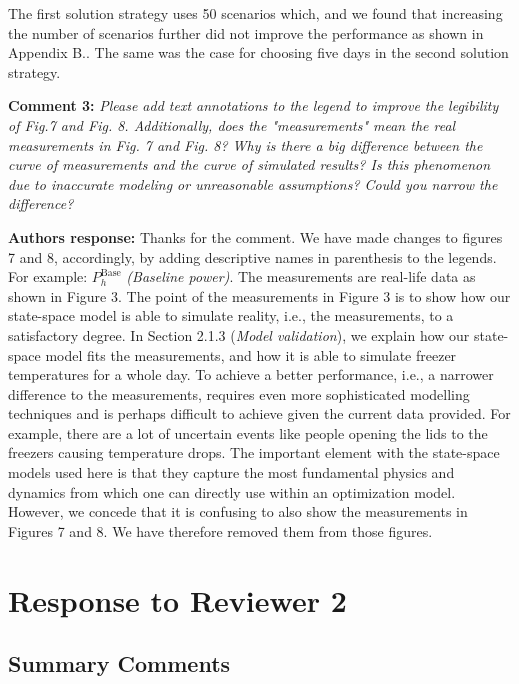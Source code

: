 \documentclass[10pt]{article}
\newcounter{models}
\newcommand{\nt}[1]{\textcolor{newtextcolor}{#1}}
\newcommand{\auth}{\textbf{Authors response: }}
\newcommand{\changes}{\textbf{Changes to the manuscript: }}
\begin{document}
\nt{The first solution strategy uses 50 scenarios which, and we found that increasing the number of scenarios further did not improve the performance as shown in Appendix B.. The same was the case for choosing five days in the second solution strategy.}

\textbf{Comment 3:} \textit{Please add text annotations to the legend to improve the legibility of Fig.7 and Fig. 8. Additionally, does the "measurements" mean the real measurements in Fig. 7 and Fig. 8? Why is there a big difference between the curve of measurements and the curve of simulated results? Is this phenomenon due to inaccurate modeling or unreasonable assumptions? Could you narrow the difference?}

\auth Thanks for the comment. We have made changes to figures 7 and 8, accordingly, by adding descriptive names in parenthesis to the legends. For example: $P_{h}^{\text{Base}}$ \textit{(Baseline power)}. The measurements are real-life data as shown in Figure 3. The point of the measurements in Figure 3 is to show how our state-space model is able to simulate reality, i.e., the measurements, to a satisfactory degree. In Section 2.1.3 (\textit{Model validation}), we explain how our state-space model fits the measurements, and how it is able to simulate freezer temperatures for a whole day. To achieve a better performance, i.e., a narrower difference to the measurements, requires even more sophisticated modelling techniques and is perhaps difficult to achieve given the current data provided. For example, there are a lot of uncertain events like people opening the lids to the freezers causing temperature drops. The important element with the state-space models used here is that they capture the most fundamental physics and dynamics from which one can directly use within an optimization model. However, we concede that it is confusing to also show the measurements in Figures 7 and 8. We have therefore removed them from those figures.




\newpage
\section{Response to Reviewer 2}

\subsection{Summary Comments} \label{rl_sec:rev2_summary_comms}
\end{document}
